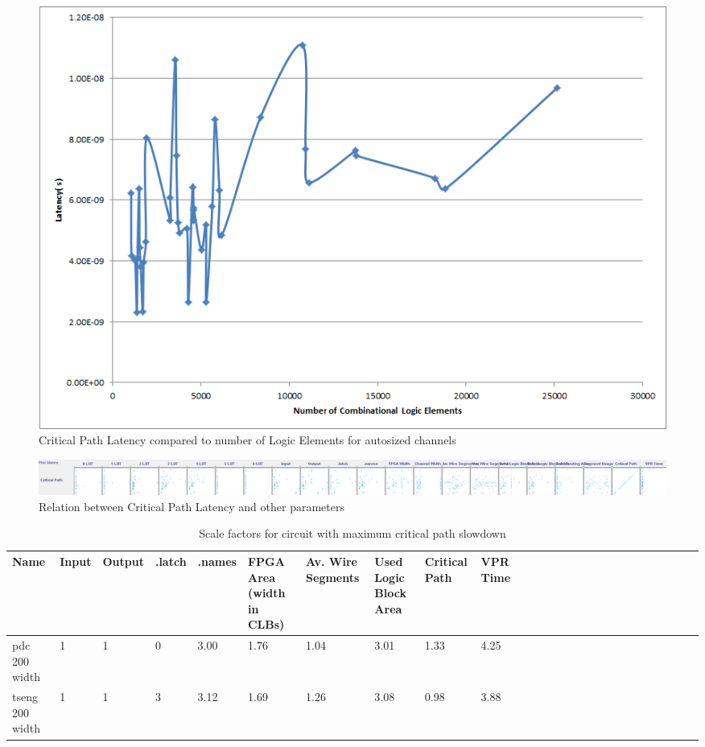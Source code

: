 \documentclass[12pt,drafta4paper,oneside]{memoir} %
\begin{document}
\begin{figure}
    \includegraphics[width=\textwidth]{images/InputsVTiming-1.png}
    \caption{Critical Path Latency compared to number of Logic Elements for autosized channels}
    \label{AreaVElements}
\end{figure}
\begin{figure}
    \includegraphics[width=\textwidth]{images/WekaTime.png}
    \caption{Relation between Critical Path Latency and other parameters}
    \label{AreaVElements}
\end{figure}

\begin{table}
    \begin{adjustwidth}{-1cm}{-1.1cm}
        \begin{tabularx}{1.1\textwidth}{XXXXXXXXXXXXXXXXXXXXXXXXXX}
           \toprule
            Name & Input & Output & .latch & .names & FPGA Area (width in CLBs) & Av. Wire Segments & Used Logic Block Area & Critical Path & VPR Time\\
            \midrule
pdc 200 width   & 1 & 1 & 0 & 3.00 & 1.76 & 1.04 & 3.01 & 1.33 & 4.25\\
tseng 200 width & 1 & 1 & 3 & 3.12 & 1.69 & 1.26 & 3.08 & 0.98 & 3.88\\
          \bottomrule
        \end{tabularx}
        \caption{Scale factors for circuit with maximum critical path slowdown}
        \label{timing2}
    \end{adjustwidth}
\end{table}
\end{document}
